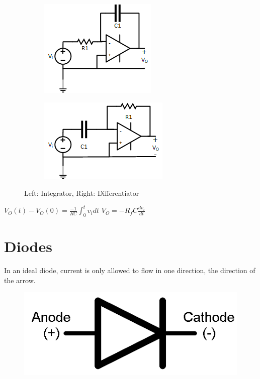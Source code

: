 \documentclass[10pt,letterpaper,twoside,notitlepage]{article}
\begin{document}
	\begin{figure}[ht]
		\begin{subfigure}
			\centering
			\includegraphics[scale=.7]{Integrator.png}
			\label{fig:Integrator}
		\end{subfigure}
		\hspace{25mm}
		\begin{subfigure}
			\centering
			\includegraphics[scale=.7]{Differentiator.png}
			\label{fig:Differentiator}
		\end{subfigure}
		\caption{Left: Integrator, Right: Differentiator}
	\end{figure}
	$V_{O}(t)-V_{O}(0)=\frac{-1}{RC}\int_{0}^{t} v_i dt$
	\hspace{30mm} $V_{O}=-R_f C \frac{dv_i}{dt}$
	
\section*{Diodes}
	In an ideal diode, current is only allowed to flow in one direction, the direction of the arrow. \newline
	
	\begin{figure}[!htbp]
		\centering
		\includegraphics[scale=.15]{Diode.png}
		\label{fig:Diode}
	\end{figure} 
	
\end{document}
